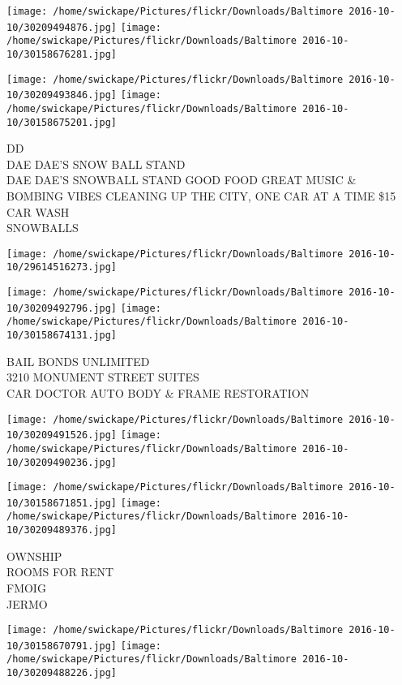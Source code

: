\documentclass[10pt,letterpaper]{article}
\begin{document}
\texttt{[image: /home/swickape/Pictures/flickr/Downloads/Baltimore 2016-10-10/30209494876.jpg]}
\texttt{[image: /home/swickape/Pictures/flickr/Downloads/Baltimore 2016-10-10/30158676281.jpg]}

\texttt{[image: /home/swickape/Pictures/flickr/Downloads/Baltimore 2016-10-10/30209493846.jpg]}
\texttt{[image: /home/swickape/Pictures/flickr/Downloads/Baltimore 2016-10-10/30158675201.jpg]}

DD\\
DAE DAE'S SNOW BALL STAND\\
DAE DAE'S SNOWBALL STAND GOOD FOOD GREAT MUSIC \& BOMBING VIBES CLEANING UP THE CITY, ONE CAR AT A TIME \$15 CAR WASH\\
SNOWBALLS\\
\pagebreak

\texttt{[image: /home/swickape/Pictures/flickr/Downloads/Baltimore 2016-10-10/29614516273.jpg]}

\vspace{0.25in}
\texttt{[image: /home/swickape/Pictures/flickr/Downloads/Baltimore 2016-10-10/30209492796.jpg]}
\texttt{[image: /home/swickape/Pictures/flickr/Downloads/Baltimore 2016-10-10/30158674131.jpg]}

BAIL BONDS UNLIMITED\\
3210 MONUMENT STREET SUITES\\
CAR DOCTOR AUTO BODY \& FRAME RESTORATION\\
\pagebreak

\texttt{[image: /home/swickape/Pictures/flickr/Downloads/Baltimore 2016-10-10/30209491526.jpg]}
\texttt{[image: /home/swickape/Pictures/flickr/Downloads/Baltimore 2016-10-10/30209490236.jpg]}

\texttt{[image: /home/swickape/Pictures/flickr/Downloads/Baltimore 2016-10-10/30158671851.jpg]}
\texttt{[image: /home/swickape/Pictures/flickr/Downloads/Baltimore 2016-10-10/30209489376.jpg]}

OWNSHIP\\
ROOMS FOR RENT\\
FMOIG\\
JERMO\\
\pagebreak

\texttt{[image: /home/swickape/Pictures/flickr/Downloads/Baltimore 2016-10-10/30158670791.jpg]}
\texttt{[image: /home/swickape/Pictures/flickr/Downloads/Baltimore 2016-10-10/30209488226.jpg]}
\end{document}
